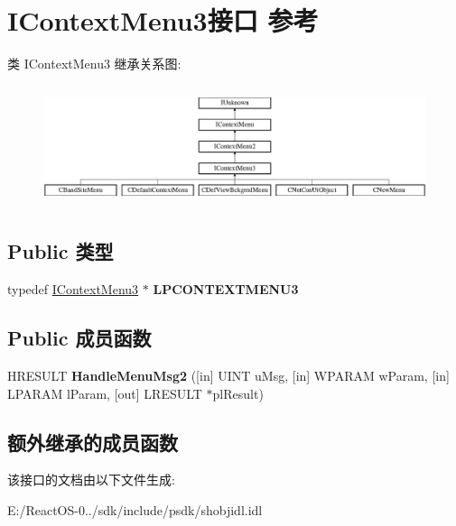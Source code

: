 \hypertarget{interface_i_context_menu3}{}\section{I\+Context\+Menu3接口 参考}
\label{interface_i_context_menu3}
类 I\+Context\+Menu3 继承关系图\+:\begin{figure}[H]
\begin{center}
\leavevmode
\includegraphics[height=3.589744cm]{interface_i_context_menu3}
\end{center}
\end{figure}
\subsection*{Public 类型}
\begin{DoxyCompactItemize}
\item 
\mbox{\label{interface_i_context_menu3_ab5bd6fe39a039161bfa4d4eb2004ec5a}} 
typedef \hyperlink{interface_i_context_menu3}{I\+Context\+Menu3} $\ast$ {\bfseries L\+P\+C\+O\+N\+T\+E\+X\+T\+M\+E\+N\+U3}
\end{DoxyCompactItemize}
\subsection*{Public 成员函数}
\begin{DoxyCompactItemize}
\item 
\mbox{\label{interface_i_context_menu3_a12822bc4a2f059681a4267379ce8663c}} 
H\+R\+E\+S\+U\+LT {\bfseries Handle\+Menu\+Msg2} (\mbox{[}in\mbox{]} U\+I\+NT u\+Msg, \mbox{[}in\mbox{]} W\+P\+A\+R\+AM w\+Param, \mbox{[}in\mbox{]} L\+P\+A\+R\+AM l\+Param, \mbox{[}out\mbox{]} L\+R\+E\+S\+U\+LT $\ast$pl\+Result)
\end{DoxyCompactItemize}
\subsection*{额外继承的成员函数}


该接口的文档由以下文件生成\+:\begin{DoxyCompactItemize}
\item 
E\+:/\+React\+O\+S-\/0../sdk/include/psdk/shobjidl.\+idl\end{DoxyCompactItemize}
